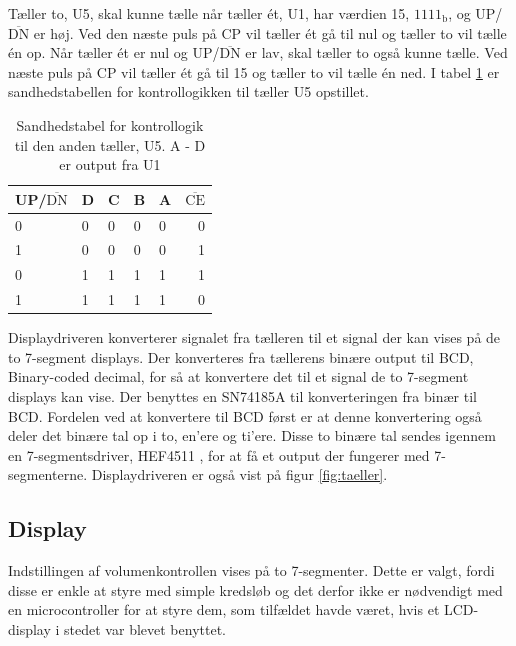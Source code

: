 Tæller to, U5, skal kunne tælle når tæller ét, U1, har værdien 15, $1111_\mathrm{b}$, og UP/$\overline{\mathrm{DN}}$ er høj. Ved den næste puls på CP vil tæller ét gå til nul og tæller to vil tælle én op. Når tæller ét er nul og UP/$\overline{\mathrm{DN}}$ er lav, skal tæller to også kunne tælle. Ved næste puls på CP vil tæller ét gå til 15 og tæller to vil tælle én ned. I tabel \ref{tab:taeller2} er sandhedstabellen for kontrollogikken til tæller U5 opstillet.

\begin{table}[h]
\centering
\begin{tabular}{|l|l|l|l|l||r|}
\hline
UP/$\overline{\mathrm{DN}}$ & D & C & B & A & $\overline{\mathrm{CE}}$ \\ \hline
0 & 0 & 0 & 0 & 0 & 0 \\
1 & 0 & 0 & 0 & 0 & 1 \\
0 & 1 & 1 & 1 & 1 & 1 \\
1 & 1 & 1 & 1 & 1 & 0 \\
\hline
\end{tabular}
\caption{Sandhedstabel for kontrollogik til den anden tæller, U5. A - D er output fra U1}
\label{tab:taeller2}
\end{table}

Displaydriveren konverterer signalet fra tælleren til et signal der kan vises på de to 7-segment displays. Der konverteres fra tællerens binære output til BCD, Binary-coded decimal, for så at konvertere det til et signal de to 7-segment displays kan vise. Der benyttes en SN74185A \cite{sn74185a-datablad} til konverteringen fra binær til BCD. Fordelen ved at konvertere til BCD først er at denne konvertering også deler det binære tal op i to, en'ere og ti'ere. Disse to binære tal sendes igennem en 7-segmentsdriver, HEF4511 \cite{hef4511-datablad}, for at få et output der fungerer med 7-segmenterne. Displaydriveren er også vist på figur \ref{fig:taeller}.

\subsection*{Display}
\label{volumenkontrol-design-display}
Indstillingen af volumenkontrollen vises på to 7-segmenter. Dette er valgt, fordi disse er enkle at styre med simple kredsløb og det derfor ikke er nødvendigt med en microcontroller for at styre dem, som tilfældet havde været, hvis et LCD-display i stedet var blevet benyttet.

